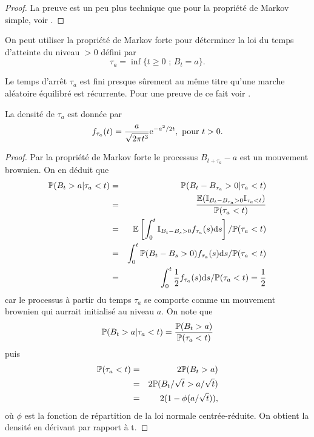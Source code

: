 \begin{proof}
La preuve est un peu plus technique que pour la propriété de Markov simple, voir \citet[Theoreme 2.3]{Gall2012}.
\end{proof}
On peut utiliser la propriété de Markov forte pour déterminer la loi du temps d'atteinte du niveau $>0$ défini par 
$$
\tau_a = \inf\{t\geq 0\text{ ; }B_t  = a\}.
$$
\begin{remark}
Le temps d'arrêt $\tau_a$ est fini presque sûrement au même titre qu'une marche aléatoire équilibré est récurrente. Pour une preuve de ce fait voir \citet[Corollaire 2.3]{Gall2012}.
\end{remark}
\begin{prop}
La densité de $\tau_a$ est donnée par 
$$
f_{\tau_a}(t)=\frac{a}{\sqrt{2\pi t^3}}\mathrm{e}^{-a^2/2t},\text{ pour }t>0.
$$
\end{prop}
\begin{proof}
Par la propriété de Markov forte le processus $B_{t+\tau_a}-a$ est un mouvement brownien. On en déduit que 
\begin{eqnarray*}
\mathbb{P}(B_t > a | \tau_a < t) &=& \mathbb{P}(B_t - B_{\tau_a} > 0 | \tau_a < t)\\
&=&\frac{ \mathbb{E}(\mathbb{I}_{B_t - B_{\tau_a} > 0}\mathbb{I}_{\tau_a < t})}{\mathbb{P}(\tau_a < t)}\\
&=&\mathbb{E}\left[\int_0^t\mathbb{I}_{B_t - B_{s} > 0}f_{\tau_a}(s)\text{d}s\right]/ \mathbb{P}(\tau_a < t)\\
&=&\int_0^t\mathbb{P}(B_t - B_{s} > 0)f_{\tau_a}(s)\text{d}s/ \mathbb{P}(\tau_a < t)\\
&=&\int_0^t\frac{1}{2}f_{\tau_a}(s)\text{d}s/ \mathbb{P}(\tau_a < t) = \frac{1}{2}
\end{eqnarray*}
car le processus à partir du temps $\tau_a$ se comporte comme un mouvement brownien qui aurrait initialisé au niveau $a$. On note que 
$$
\mathbb{P}(B_t > a | \tau_a < t) = \frac{\mathbb{P}(B_t>a)}{\mathbb{P}(\tau_a <t)}
$$
puis
\begin{eqnarray*}
\mathbb{P}(\tau_a <t) &=&2\mathbb{P}(B_t>a)\\
 &=&2\mathbb{P}(B_t / \sqrt{t} >a/\sqrt{t})\\
 &=&2(1-\phi(a/\sqrt{t})),
\end{eqnarray*}
où $\phi$ est la fonction de répartition de la loi normale centrée-réduite. On obtient la densité en dérivant par rapport à t.
\end{proof}

